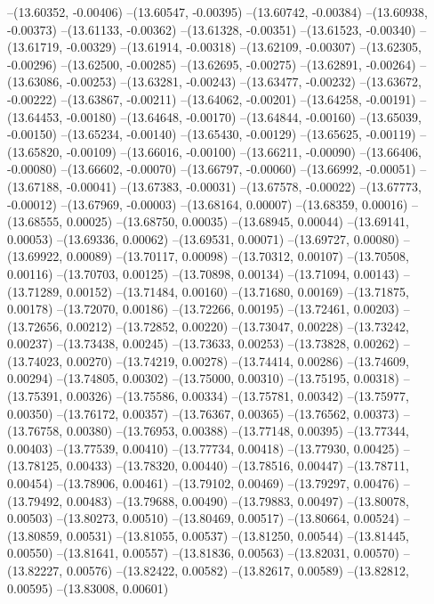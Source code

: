 --(13.60352, -0.00406)
--(13.60547, -0.00395)
--(13.60742, -0.00384)
--(13.60938, -0.00373)
--(13.61133, -0.00362)
--(13.61328, -0.00351)
--(13.61523, -0.00340)
--(13.61719, -0.00329)
--(13.61914, -0.00318)
--(13.62109, -0.00307)
--(13.62305, -0.00296)
--(13.62500, -0.00285)
--(13.62695, -0.00275)
--(13.62891, -0.00264)
--(13.63086, -0.00253)
--(13.63281, -0.00243)
--(13.63477, -0.00232)
--(13.63672, -0.00222)
--(13.63867, -0.00211)
--(13.64062, -0.00201)
--(13.64258, -0.00191)
--(13.64453, -0.00180)
--(13.64648, -0.00170)
--(13.64844, -0.00160)
--(13.65039, -0.00150)
--(13.65234, -0.00140)
--(13.65430, -0.00129)
--(13.65625, -0.00119)
--(13.65820, -0.00109)
--(13.66016, -0.00100)
--(13.66211, -0.00090)
--(13.66406, -0.00080)
--(13.66602, -0.00070)
--(13.66797, -0.00060)
--(13.66992, -0.00051)
--(13.67188, -0.00041)
--(13.67383, -0.00031)
--(13.67578, -0.00022)
--(13.67773, -0.00012)
--(13.67969, -0.00003)
--(13.68164, 0.00007)
--(13.68359, 0.00016)
--(13.68555, 0.00025)
--(13.68750, 0.00035)
--(13.68945, 0.00044)
--(13.69141, 0.00053)
--(13.69336, 0.00062)
--(13.69531, 0.00071)
--(13.69727, 0.00080)
--(13.69922, 0.00089)
--(13.70117, 0.00098)
--(13.70312, 0.00107)
--(13.70508, 0.00116)
--(13.70703, 0.00125)
--(13.70898, 0.00134)
--(13.71094, 0.00143)
--(13.71289, 0.00152)
--(13.71484, 0.00160)
--(13.71680, 0.00169)
--(13.71875, 0.00178)
--(13.72070, 0.00186)
--(13.72266, 0.00195)
--(13.72461, 0.00203)
--(13.72656, 0.00212)
--(13.72852, 0.00220)
--(13.73047, 0.00228)
--(13.73242, 0.00237)
--(13.73438, 0.00245)
--(13.73633, 0.00253)
--(13.73828, 0.00262)
--(13.74023, 0.00270)
--(13.74219, 0.00278)
--(13.74414, 0.00286)
--(13.74609, 0.00294)
--(13.74805, 0.00302)
--(13.75000, 0.00310)
--(13.75195, 0.00318)
--(13.75391, 0.00326)
--(13.75586, 0.00334)
--(13.75781, 0.00342)
--(13.75977, 0.00350)
--(13.76172, 0.00357)
--(13.76367, 0.00365)
--(13.76562, 0.00373)
--(13.76758, 0.00380)
--(13.76953, 0.00388)
--(13.77148, 0.00395)
--(13.77344, 0.00403)
--(13.77539, 0.00410)
--(13.77734, 0.00418)
--(13.77930, 0.00425)
--(13.78125, 0.00433)
--(13.78320, 0.00440)
--(13.78516, 0.00447)
--(13.78711, 0.00454)
--(13.78906, 0.00461)
--(13.79102, 0.00469)
--(13.79297, 0.00476)
--(13.79492, 0.00483)
--(13.79688, 0.00490)
--(13.79883, 0.00497)
--(13.80078, 0.00503)
--(13.80273, 0.00510)
--(13.80469, 0.00517)
--(13.80664, 0.00524)
--(13.80859, 0.00531)
--(13.81055, 0.00537)
--(13.81250, 0.00544)
--(13.81445, 0.00550)
--(13.81641, 0.00557)
--(13.81836, 0.00563)
--(13.82031, 0.00570)
--(13.82227, 0.00576)
--(13.82422, 0.00582)
--(13.82617, 0.00589)
--(13.82812, 0.00595)
--(13.83008, 0.00601)

